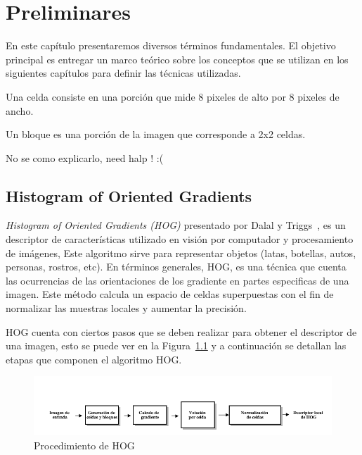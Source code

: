 \chapter[Preliminares ]{Preliminares }\label{ch:capitulo3}
En este capítulo presentaremos diversos términos fundamentales. El objetivo principal es entregar un marco teórico sobre los conceptos que se utilizan en los siguientes capítulos para definir las técnicas utilizadas.
\begin{definition}[Celdas]
\label{def:cel}
Una celda consiste en una porción que mide 8 pixeles de alto por 8 pixeles de ancho.
\end{definition}
\begin{definition}[Bloques]
\label{def:blo}
Un bloque es una porción de la imagen que corresponde a 2x2 celdas.
\end{definition}
\begin{definition}[Bins]
\label{def:bin}
No se como explicarlo, need halp ! :(
\end{definition}

\section{Histogram of Oriented Gradients}\label{subsec:hog}
\textit{Histogram of Oriented Gradients (HOG)} presentado por Dalal y Triggs~\cite{hog2005}, es un descriptor de características utilizado en visión por computador y procesamiento de imágenes, Este algoritmo sirve para representar objetos (latas, botellas, autos, personas, rostros, etc). En términos generales, HOG, es una técnica que cuenta las ocurrencias de las orientaciones de los gradiente en partes especificas de una imagen. Este método calcula un espacio de celdas superpuestas con el fin de normalizar las muestras locales y aumentar la precisión.

HOG cuenta con ciertos pasos que se deben realizar para obtener el descriptor de una imagen, esto se puede ver en la Figura~\ref{fig:hog_procedure} y a continuación se detallan las etapas que componen el algoritmo HOG.
\begin{figure}[tb]
  \centering
   \includegraphics[width=1\textwidth]{Figuras/hog-procedure.png}
   \caption{Procedimiento de HOG}
   \label{fig:hog_procedure}
\end{figure}

